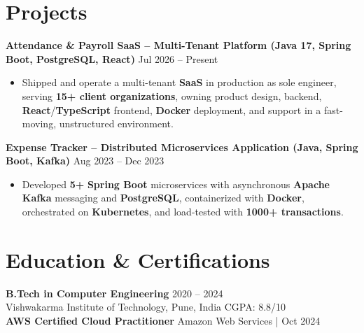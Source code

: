 \documentclass[a4paper,10pt]{article}
\begin{document}
\section*{Projects}

\textbf{Attendance \& Payroll SaaS -- Multi-Tenant Platform (Java 17, Spring Boot, PostgreSQL, React)} \hfill Jul 2026 -- Present
\begin{itemize}[leftmargin=*]
    \item Shipped and operate a multi-tenant \textbf{SaaS} in production as sole engineer, serving \textbf{15+ client organizations}, owning product design, backend, \textbf{React}/\textbf{TypeScript} frontend, \textbf{Docker} deployment, and support in a fast-moving, unstructured environment.
\end{itemize}

\textbf{Expense Tracker -- Distributed Microservices Application (Java, Spring Boot, Kafka)} \hfill Aug 2023 -- Dec 2023
\begin{itemize}[leftmargin=*]
    \item Developed \textbf{5+} \textbf{Spring Boot} microservices with asynchronous \textbf{Apache Kafka} messaging and \textbf{PostgreSQL}, containerized with \textbf{Docker}, orchestrated on \textbf{Kubernetes}, and load-tested with \textbf{1000+ transactions}.
\end{itemize}

\section*{Education \& Certifications}
\textbf{B.Tech in Computer Engineering} \hfill 2020 -- 2024 \\
Vishwakarma Institute of Technology, Pune, India \hfill CGPA: 8.8/10 \\
\textbf{AWS Certified Cloud Practitioner} \hfill Amazon Web Services \;|\; Oct 2024
\end{document}
